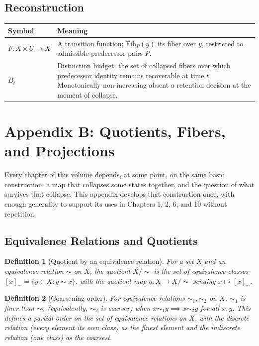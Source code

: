 \documentclass[12pt]{report}
\newtheorem{definition}{Definition}[section]
\begin{document}
\section*{Reconstruction}

\begin{center}
\begin{tabular}{lp{4.6in}}
\hline
Symbol & Meaning \\
\hline
$F : X \times U \to X$ & A transition function; $\mathrm{Fib}_P(y)$
its fiber over $y$, restricted to admissible predecessor pairs $P$. \\
$B_t$ & Distinction budget: the set of collapsed fibers over which
predecessor identity remains recoverable at time $t$. Monotonically
non-increasing absent a retention decision at the moment of collapse. \\
\hline
\end{tabular}
\end{center}

\chapter*{Appendix B: Quotients, Fibers, and Projections}

Every chapter of this volume depends, at some point, on the same basic
construction: a map that collapses some states together, and the
question of what survives that collapse. This appendix develops that
construction once, with enough generality to support its uses in
Chapters 1, 2, 6, and 10 without repetition.

\section*{Equivalence Relations and Quotients}

\begin{definition}[Quotient by an equivalence relation]
For a set $X$ and an equivalence relation $\sim$ on $X$, the quotient
$X/{\sim}$ is the set of equivalence classes $[x]_\sim = \{y \in X : y
\sim x\}$, with the quotient map $q : X \to X/{\sim}$ sending $x \mapsto
[x]_\sim$.
\end{definition}

\begin{definition}[Coarsening order]
For equivalence relations $\sim_1, \sim_2$ on $X$, $\sim_1$ is finer
than $\sim_2$ (equivalently, $\sim_2$ is coarser) when $x \sim_1 y
\implies x \sim_2 y$ for all $x,y$. This defines a partial order on the
set of equivalence relations on $X$, with the discrete relation (every
element its own class) as the finest element and the indiscrete
relation (one class) as the coarsest.
\end{definition}
\end{document}
